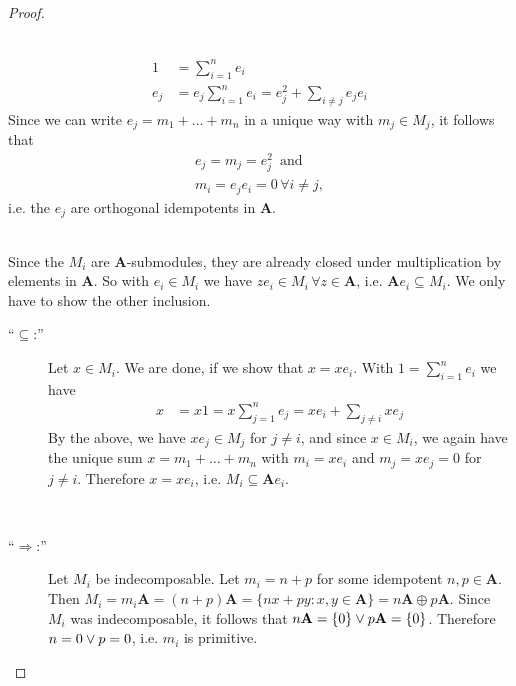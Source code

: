 \begin{proof}[Proof\nopunct]
\begin{subproof}
\phantom{}\\
\begin{align*}
1 &= \sum_{i=1}^{n} e_{i}\\
e_{j} &= e_{j}\sum_{i=1}^{n} e_{i} = e_{j}^{2} + \sum_{i\neq j} e_{j} e_{i}
\end{align*}
Since we can write $e_{j} = m_{1} + \dots + m_{n}$ in a unique way with $m_{j} \in M_{j}$, it follows that
\begin{align*}
e_{j} = m_{j} = e_{j}^{2}\, \text{ and }\\
m_{i} = e_{j} e_{i} = 0\,\forall i \neq j,
\end{align*}
i.e. the $e_{j}$ are orthogonal idempotents in $\mathbf{A}$.
\end{subproof}
\begin{subproof}[Proof that $M_{i} = \mathbf{A}e_{i}$]\phantom{}\\
Since the $M_{i}$ are $\mathbf{A}$-submodules, they are already closed under multiplication by elements in $\mathbf{A}$.
So with $e_{i} \in M_{i}$ we have $ze_{i} \in M_{i}\, \forall z \in \mathbf{A}$, i.e. $\mathbf{A}e_{i} \subseteq M_{i}$.
We only have to show the other inclusion.
\begin{description}
\item[``$\subseteq$:''] Let $x \in M_{i}$. We are done, if we show that $x = xe_{i}$. With $1 = \sum_{i=1}^{n} e_{i}$ we have
\begin{align*}
x &= x1 = x\sum_{j=1}^{n} e_{j} = xe_{i} + \sum_{j\neq i} xe_{j}
\end{align*}
By the above, we have $xe_{j} \in M_{j}$ for $j\neq i$, and since $x \in M_{i}$, we again have the unique sum $x = m_{1} + \dots + m_{n}$
with $m_{i} = xe_{i}$ and $m_{j} = xe_{j} = 0$ for $j \neq i$. Therefore $x = xe_{i}$, i.e. $M_{i} \subseteq \mathbf{A}e_{i}$.
\end{description}
\end{subproof}
\begin{subproof}\phantom{}\\
\begin{description}
\item[``$\Rightarrow$:''] Let $M_{i}$ be indecomposable. Let $m_{i} = n + p$ for some idempotent $n, p \in \mathbf{A}$. Then
$M_{i} = m_{i}\mathbf{A} = (n+p)\mathbf{A} = \{nx + py : x,y \in \mathbf{A}\} = n\mathbf{A} \oplus p\mathbf{A}$. Since $M_{i}$ was
indecomposable, it follows that $n\mathbf{A} = \{0\} \vee p\mathbf{A} = \{0\}$. Therefore $n = 0 \vee p = 0$, i.e. $m_{i}$ is primitive.


\end{description}
\end{subproof}
\end{proof}
